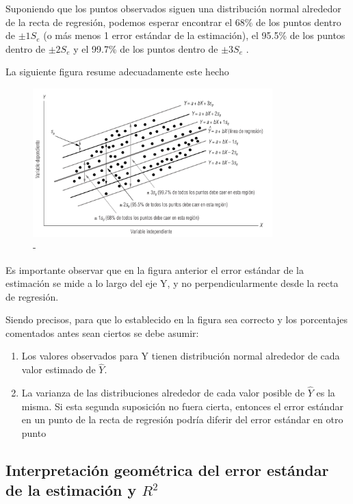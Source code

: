\documentclass[]{book}
\providecommand{\tightlist}{%
  \setlength{\itemsep}{0pt}\setlength{\parskip}{0pt}}
\theoremstyle{plain}
\theoremstyle{definition}
\begin{document}
Suponiendo que los puntos observados siguen una distribución normal
alrededor de la recta de regresión, podemos esperar encontrar el 68\% de
los puntos dentro de \(\pm 1 S_e\) (o más menos 1 error estándar de la
estimación), el 95.5\% de los puntos dentro de \(\pm 2 S_e\) y el 99.7\%
de los puntos dentro de \(\pm 3 S_e\) .

La siguiente figura resume adecuadamente este hecho

\begin{figure}
\centering
\includegraphics[width=3.64583in,height=\textheight]{img/error_regression_2.png}
\caption{-}
\end{figure}

Es importante observar que en la figura anterior el error estándar de la
estimación se mide a lo largo del eje Y, y no perpendicularmente desde
la recta de regresión.

Siendo precisos, para que lo establecido en la figura sea correcto y los
porcentajes comentados antes sean ciertos se debe asumir:

\begin{enumerate}
\def\labelenumi{\arabic{enumi}.}
\tightlist
\item
  Los valores observados para Y tienen distribución normal alrededor de
  cada valor estimado de \(\hat Y\).
\item
  La varianza de las distribuciones alrededor de cada valor posible de
  \(\hat Y\) es la misma. Si esta segunda suposición no fuera cierta,
  entonces el error estándar en un punto de la recta de regresión podría
  diferir del error estándar en otro punto
\end{enumerate}

\hypertarget{interpretaciuxf3n-geomuxe9trica-del-error-estuxe1ndar-de-la-estimaciuxf3n-y-r2}{%
\subsection{\texorpdfstring{Interpretación geométrica del error estándar
de la estimación y
\(R^2\)}{Interpretación geométrica del error estándar de la estimación y R\^{}2}}\label{interpretaciuxf3n-geomuxe9trica-del-error-estuxe1ndar-de-la-estimaciuxf3n-y-r2}}
\end{document}
